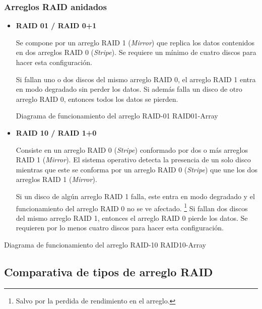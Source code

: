 \subsubsection*{Arreglos RAID anidados}

\begin{itemize}

  \item \textbf{RAID 01 / RAID 0+1}

Se compone por un arreglo \textsc{RAID} 1 (\textit{Mirror}) que replica los datos contenidos en dos arreglos \textsc{RAID} 0 (\textit{Stripe}). Se requiere un m\'{i}nimo de cuatro discos para hacer esta configuraci\'{o}n.

Si fallan uno o dos discos del mismo arreglo \textsc{RAID} 0, el arreglo \textsc{RAID} 1 entra en modo degradado sin perder los datos. Si adem\'{a}s falla un disco de otro arreglo \textsc{RAID} 0, entonces todos los datos se pierden.

\diagramblock
{Diagrama de funcionamiento del arreglo \textsc{RAID-01}}
{RAID01-Array}
{
 {
  
 }
}

\newpage
  \item \textbf{RAID 10 / RAID 1+0}

Consiste en un arreglo \textsc{RAID} 0 (\textit{Stripe}) conformado por dos o m\'{a}s arreglos \textsc{RAID} 1 (\textit{Mirror}). El sistema operativo detecta la presencia de un solo disco mientras que este se conforma por un arreglo \textsc{RAID} 0 (\textit{Stripe}) que une los dos arreglos \textsc{RAID} 1 (\textit{Mirror}).

Si un disco de alg\'{u}n arreglo \textsc{RAID} 1 falla, este entra en modo degradado y el funcionamiento del arreglo \textsc{RAID} 0 no se ve afectado. \footnote{Salvo por la perdida de rendimiento en el arreglo.} Si fallan dos discos del mismo arreglo \textsc{RAID} 1, entonces el arreglo \textsc{RAID} 0 pierde los datos. Se requieren por lo menos cuatro discos para hacer esta configuraci\'{o}n.

\end{itemize}

\diagramblock
{Diagrama de funcionamiento del arreglo \textsc{RAID-10}}
{RAID10-Array}
{
 {
  
 }
}

\newpage
      \subsection {Comparativa de tipos de arreglo RAID}

